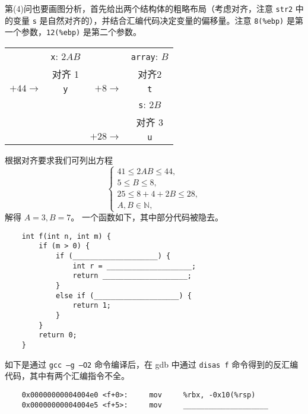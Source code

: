 \begin{problems}
        第(4)问也要画图分析，首先给出两个结构体的粗略布局（考虑对齐，注意 \verb|str2| 中的变量 \verb|s| 是自然对齐的），并结合汇编代码决定变量的偏移量。注意 \verb|8(%ebp)| 是第一个参数，\verb|12(%ebp)| 是第二个参数。
        \begin{table}[H]
            \centering
            \begin{tabular}{rcr|c|}
                \cline{2-2} \cline{4-4}
                \multicolumn{1}{r|}{} & \multicolumn{1}{c|}{\texttt{x}: $2AB$} &  & \texttt{array}: $B$ \\ \cline{2-2} \cline{4-4} 
                \multicolumn{1}{r|}{} & \multicolumn{1}{c|}{对齐 1} &  & 对齐2 \\ \cline{2-2} \cline{4-4} 
                \multicolumn{1}{r|}{$+44 \to$} & \multicolumn{1}{c|}{\texttt{y}} & $+8 \to$ & \texttt{t} \\ \cline{2-2} \cline{4-4} 
                &  &  & \texttt{s}: $2B$ \\ \cline{4-4} 
                &  &  & 对齐 3 \\ \cline{4-4} 
                &  & $+28 \to$ & \texttt{u} \\ \cline{4-4} 
            \end{tabular}
        \end{table}
        根据对齐要求我们可列出方程
        \[ \begin{cases}
            41 \leq 2AB \leq 44, \\
            5 \leq B \leq 8, \\
            25 \leq 8+4+2B \leq 28, \\
            A, B \in \mathbb N,
        \end{cases} \]
        解得 $A=3, B=7$。
         一个函数如下，其中部分代码被隐去。
        \begin{verbatim}
    int f(int n, int m) {
        if (m > 0) {
            if (____________________) {
                int r = ____________________;
                return ____________________;
            }
            else if (____________________) {
                return 1;
            }
        }
        return 0;
    }
        \end{verbatim}
        如下是通过 \verb|gcc –g –O2| 命令编译后，在 gdb 中通过 \verb|disas f| 命令得到的反汇编代码，其中有两个汇编指令不全。
        \begin{verbatim}
    0x00000000004004e0 <f+0>:     mov     %rbx, -0x10(%rsp)
    0x00000000004004e5 <f+5>:     mov     ____________________

\end{verbatim}
\end{problems}
